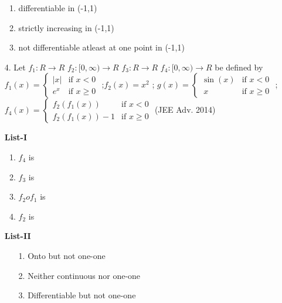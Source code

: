 \documentclass[journal,12pt,twocolumn]{IEEEtran}
\theoremstyle{remark}
\begin{document}
\begin{enumerate}
\begin{multicols}{2}
\begin{enumerate}[label=(\alph*), start=16]
					\item differentiable in (-1,1)

					\item strictly increasing in (-1,1)

					\item  not differentiable atleast at one point in  (-1,1)
				\end{enumerate}
			\end{multicols}
		\item[ 4. ] Let $f_1:R\rightarrow R$ $f_2:[0,\infty)\rightarrow R$ $f_3:R\rightarrow R$ $f_4:[0,\infty)\rightarrow R$ be defined by 
         $f_1(x) =
        \begin{cases}
                 |x| & \text{if } x < 0 \\
                 e^x & \text{if } x \geq 0 
                 \end{cases}$
                 ;$f_2(x)=x^2$ ; $g(x) =
                 \begin{cases}
                    \sin(x) & \text{if }  x < 0 \\
                    \ x & \text{if }  x\geq 0
                  \end{cases}$
                  ;$f_4(x) =
                  \begin{cases}
                     f_2(f_1(x)) & \text{if } x < 0 \\
                     f_2(f_1(x))-1 & \text{if } x \geq 0 
                  \end{cases}$
                  \hfill(JEE Adv. 2014)
                 \begin{multicols}{2} 
				\textbf{List-I} 
				\begin{enumerate}[label=\Alph*., start=16]
					\item $f_4$ is
					\item $f_3$ is 
					\item $f_2of_1$ is 
					\item $f_2$ is
				\end{enumerate}
				\columnbreak
				\textbf{List-II}
				\begin{enumerate}
					\item[1.]  Onto but not one-one 

					\item[2.]  Neither continuous nor one-one 

					\item[3.]  Differentiable but not one-one 


\end{enumerate}
\end{multicols}
\end{enumerate}
\end{document}
